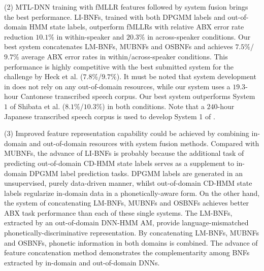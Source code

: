 \documentclass[a4paper]{article}
\begin{document}
(2) MTL-DNN training with fMLLR features followed by system fusion  brings the best performance. LI-BNFs, trained with both DPGMM labels and out-of-domain HMM state labels, outperform fMLLRs with relative ABX error rate reduction $10.1\%$ in within-speaker and $20.3\%$ in across-speaker conditions.
Our best system concatenates LM-BNFs, MUBNFs and OSBNFs and achieves $7.5\%$/$9.7\%$ average ABX error rates in within/across-speaker conditions. This performance is highly competitive  with the best submitted system for the challenge  by Heck et al. \cite{heck2017feature} ($7.8\%$/$9.7\%$). It must be noted that system development in \cite{heck2017feature} does not rely on any out-of-domain  resources, while our system uses a $19.3$-hour Cantonese transcribed speech corpus. Our best system outperforms System $1$ of Shibata et al. \cite{shibata2017composite} ($8.1\%$/$10.3\%$) in both 
conditions. 
Note that a $240$-hour Japanese transcribed speech corpus is used to develop System 1 of \cite{shibata2017composite}. 

(3) Improved feature representation capability could  be achieved by combining in-domain and out-of-domain resources  with  system fusion methods.  
Compared with MUBNFs, the advance of LI-BNFs is probably because the additional task of predicting out-of-domain CD-HMM state labels serves as a supplement to in-domain DPGMM label prediction tasks. DPGMM labels are generated in an unsupervised, purely data-driven manner, whilst out-of-domain CD-HMM state labels regularize in-domain data in a phonetically-aware form. On the other hand, the system of concatenating LM-BNFs, MUBNFs and OSBNFs achieves better ABX task performance than each of these single systems. 
The LM-BNFs, extracted by an out-of-domain DNN-HMM AM, provide language-mismatched phonetically-discriminative representation.  By concatenating LM-BNFs, MUBNFs and OSBNFs, phonetic information in both domains is combined. The advance of feature concatenation method demonstrates the complementarity among BNFs extracted by in-domain and out-of-domain DNNs.
\end{document}
